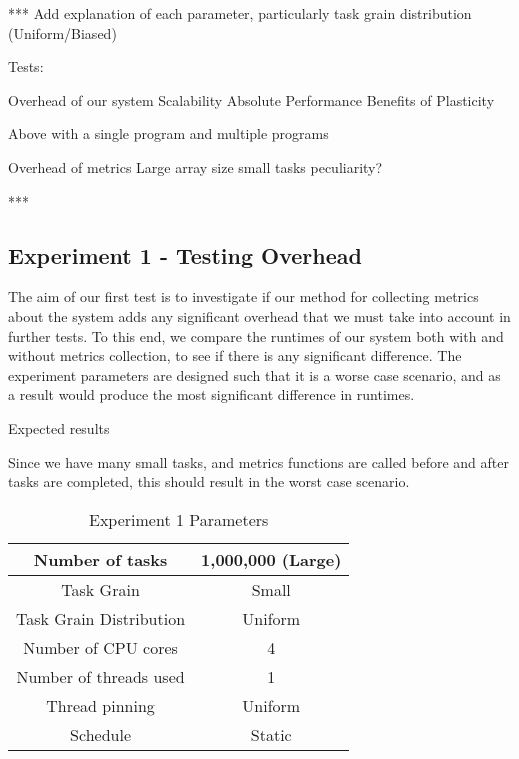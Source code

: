*** Add explanation of each parameter, particularly task grain distribution (Uniform/Biased)

Tests:

Overhead of our system
Scalability
Absolute Performance
Benefits of Plasticity

Above with a single program and multiple programs

Overhead of metrics
Large array size small tasks peculiarity?

***

\subsection{Experiment 1 - Testing Overhead}

The aim of our first test is to investigate if our method for collecting metrics about the system adds any significant overhead that we must take into account in further tests. To this end, we compare the runtimes of our system both with and without metrics collection, to see if there is any significant difference. The experiment parameters are designed such that it is a worse case scenario, and as a result would produce the most significant difference in runtimes.


Expected results

Since we have many small tasks, and metrics functions are called before and after tasks are completed, this should result in the worst case scenario.

\newcommand{\specialcell}[2][c]{%
  \begin{tabular}[#1]{@{}c@{}}#2\end{tabular}}

\begin{table}
\centering
	\begin{tabular}{|c|c|}
		\hline
		Number of tasks & 1,000,000 (Large) \\
		\hline
		Task Grain & Small \\
		\hline
		Task Grain Distribution & Uniform \\
		\hline
		Number of CPU cores & 4 \\
		\hline
		Number of threads used & 1 \\
		\hline
		Thread pinning & Uniform \\
		\hline
		Schedule & Static \\
		\hline
	\end{tabular}
\caption{Experiment 1 Parameters}
\label{table:ex1_parameters}
\end{table}






